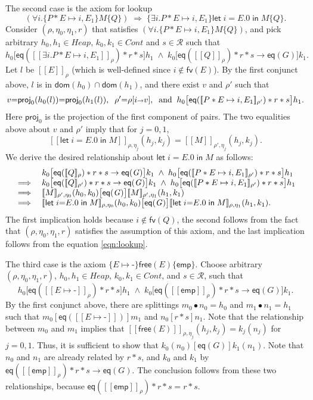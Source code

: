 \documentclass{LMCS}
\newcommand{\free}{\mathsf{free}}
\newcommand{\mletin}[2]{\mathsf{let}\;{#1}\;\mathsf{in}\;{#2}}
\newcommand{\blank}{\mbox{-}}
\newcommand{\proj}{\mathsf{proj}}
\newcommand{\emp}{\mathsf{emp}}
\newcommand{\pointsto}{\mapsto}
\newcommand{\Heap}{\mathit{Heap}}
\newcommand{\Good}{\mathit{G}}
\newcommand{\cR}{\mathcal{R}}
\newcommand{\cont}{\mathit{Cont}}
\newcommand{\FV}{\mathsf{fv}}
\newcommand{\dom}{\mathsf{dom}}
\newcommand{\bind}{{\scriptstyle\relax\rightarrow}}
\newcommand{\ff}[1]{[\![#1]\!]}
\newcommand{\mtri}[3]{\{{#1}\}{#2}\{{#3}\}}
\newcommand{\EQ}{\mathsf{eq}}
\begin{document}
The second case is the axiom for lookup 
$$
(\forall i. \mtri{P * E\pointsto i,E_1}{M}{Q}) 
\;\Rightarrow\;
\mtri
  {\exists i. P * E\pointsto i,E_1}
  {\mletin{i{=}E.0}{M}}
  {Q}. 
$$
Consider $(\rho,\eta_0,\eta_1,r)$ that
satisfies $(\forall i. \mtri{P * E\pointsto i,E_1}{M}{Q})$,
and pick arbitrary $h_0,h_1 \in \Heap$,
$k_0,k_1 \in \cont$ and $s \in\cR$ such that
$$
 h_0\bigl[\EQ(\ff{\exists i. P*E\pointsto i,E_1}_\rho)*r*s
     \bigr]h_1
  \;\wedge\;
 k_0\bigl[\EQ(\ff{Q}_\rho)*r*s \rightarrow \EQ(\Good)\bigr]k_1.
$$
Let $l$ be $\ff{E}_\rho$ (which is well-defined since 
$i \not\in \FV(E)$).  By the first conjunct above, 
$l$ is in $\dom(h_0)\cap \dom(h_1)$, and
there exist $v$ and $\rho'$ such that 
$$
  v {=} \proj_0(h_0(l)) {=} \proj_0(h_1(l)),\;\;
  \rho'{=} \rho[i \bind v],\;\;\mbox{and}\;\;
  h_0\bigl[\EQ(\ff{P*E\pointsto i,E_1}_{\rho'})*r*s\bigr]h_1.
$$
Here $\proj_0$ is the projection of 
the first component of pairs.
The two equalities above about $v$ and $\rho'$ imply that
for $j = 0,1$, 
\begin{equation}\label{eqn:lookup}
\ff{\mletin{i{=}E.0}{M}}_{\rho,\eta_j}(h_j,k_j) 
= 
\ff{M}_{\rho',\eta_j}(h_j,k_j).
\end{equation}
We derive the desired relationship about $\mletin{i{=}E.0}{M}$
as follows:
$$
\begin{array}{@{}ll@{}}
&
  k_0\bigl[\EQ(\ff{Q}_\rho)*r*s \rightarrow \EQ(\Good)\bigr]k_1
  \;\wedge\;
  h_0\bigl[\EQ(\ff{P*E\pointsto i,E_1}_{\rho'})*r*s\bigr]h_1
\\
\implies &
  k_0\bigl[\EQ(\ff{Q}_{\rho'})*r*s \rightarrow \EQ(\Good)\bigr]k_1
  \;\wedge\;
  h_0\bigl[\EQ(\ff{P*E\pointsto i,E_1}_{\rho'})*r*s\bigr]h_1
\\
\implies &
  \ff{M}_{\rho',\eta_0}(h_0,k_0)
  \bigl[\EQ(\Good)\bigr]
  \ff{M}_{\rho',\eta_1}(h_1,k_1)
\\
\implies &
  \ff{\mletin{i{=}E.0}{M}}_{\rho,\eta_0}(h_0,k_0)
  \bigl[\EQ(\Good)\bigr]
  \ff{\mletin{i{=}E.0}{M}}_{\rho,\eta_1}(h_1,k_1).
\end{array}
$$
The first implication holds because $i \not\in \FV(Q)$,
the second follows from the fact that
$(\rho,\eta_0,\eta_1,r)$ satisfies the assumption of
this axiom, and the last implication follows from
the equation \ref{eqn:lookup}.

The third case is the axiom 
$\mtri{E\pointsto \blank}{\free(E)}{\emp}$. 
Choose arbitrary $(\rho,\eta_0,\eta_1,r)$,
$h_0,h_1 \in \Heap$, $k_0,k_1 \in \cont$, and
$s \in\cR$, such that
$$
   h_0\bigl[\EQ(\ff{E\pointsto \blank}_\rho) * r * s\bigr]h_1
   \;\wedge\;
   k_0\bigl[\EQ(\ff{\emp}_\rho) * r * s 
            \rightarrow \EQ(\Good)\bigr]k_1.
$$
By the first conjunct above,
there are splittings $m_0 \bullet n_0 = h_0$ and 
$m_1 \bullet n_1 = h_1$ such that $m_0[\EQ(\ff{E\pointsto \blank})]m_1$
and $n_0[r*s]n_1$. Note that the relationship between $m_0$ and $m_1$
implies that $\ff{\free(E)}_{\rho,\eta_j}(h_j,k_j) = k_j(n_j)$ for $j=0,1$.
Thus, it is sufficient to show that $k_0(n_0)[\EQ(\Good)]k_1(n_1)$.
Note that $n_0$ and $n_1$ are already related by $r*s$, 
and $k_0$ and $k_1$ by $\EQ(\ff{\emp}_\rho)*r*s \rightarrow \EQ(\Good)$.
The conclusion follows from these two relationships, because 
$\EQ({\ff{\emp}_\rho})*r*s = r*s$.
\end{document}
